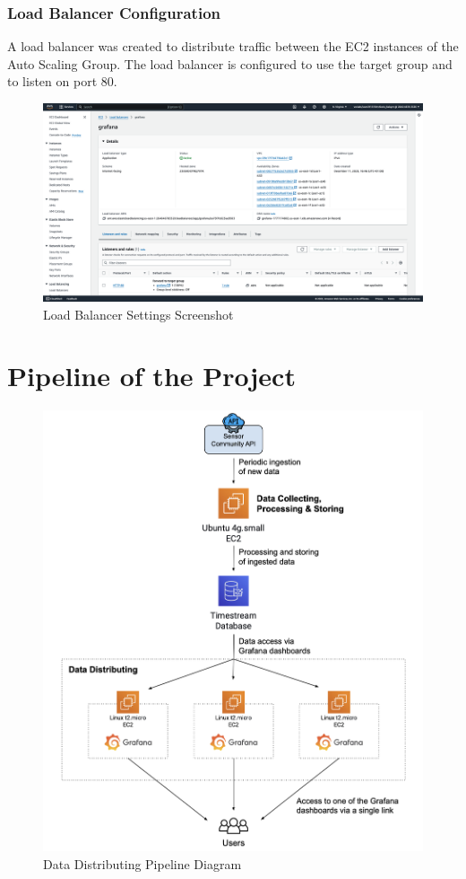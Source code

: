 \documentclass[12pt,oneside]{book} %
\begin{document}
\newpage
\subsubsection{Load Balancer Configuration}
A load balancer was created to distribute traffic between the EC2 instances of
the Auto Scaling Group. The load balancer is configured to use the target group
and to listen on port 80.

\begin{figure}[H]
    \centering
    \includegraphics[width=1\linewidth]{images/load-balancer.png}
    \caption{Load Balancer Settings Screenshot}
\end{figure}

\newpage
\section{Pipeline of the Project}

\begin{figure}[H]
    \centering
    \includegraphics[width=1\linewidth]{images/pipeline.png}
    \caption{Data Distributing Pipeline Diagram}
\end{figure}
\end{document}
